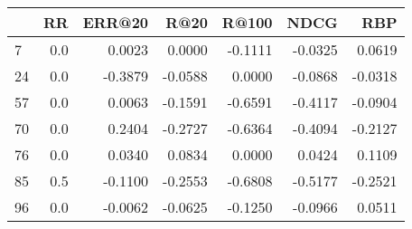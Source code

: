 \begin{tabular}{lrrrrrr}
\toprule
{} &   RR &  ERR@20 &    R@20 &   R@100 &    NDCG &     RBP \\
\midrule
7  &  0.0 &  0.0023 &  0.0000 & -0.1111 & -0.0325 &  0.0619 \\
24 &  0.0 & -0.3879 & -0.0588 &  0.0000 & -0.0868 & -0.0318 \\
57 &  0.0 &  0.0063 & -0.1591 & -0.6591 & -0.4117 & -0.0904 \\
70 &  0.0 &  0.2404 & -0.2727 & -0.6364 & -0.4094 & -0.2127 \\
76 &  0.0 &  0.0340 &  0.0834 &  0.0000 &  0.0424 &  0.1109 \\
85 &  0.5 & -0.1100 & -0.2553 & -0.6808 & -0.5177 & -0.2521 \\
96 &  0.0 & -0.0062 & -0.0625 & -0.1250 & -0.0966 &  0.0511 \\
\bottomrule
\end{tabular}
